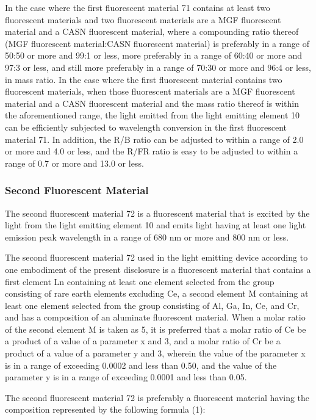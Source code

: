\documentclass[11pt,a4paper]{article}
\begin{document}
In the case where the first fluorescent material 71 contains at least two fluorescent materials and two fluorescent materials are a MGF fluorescent material and a CASN fluorescent material, where a compounding ratio thereof (MGF fluorescent material:CASN fluorescent material) is preferably in a range of 50:50 or more and 99:1 or less, more preferably in a range of 60:40 or more and 97:3 or less, and still more preferably in a range of 70:30 or more and 96:4 or less, in mass ratio. In the case where the first fluorescent material contains two fluorescent materials, when those fluorescent materials are a MGF fluorescent material and a CASN fluorescent material and the mass ratio thereof is within the aforementioned range, the light emitted from the light emitting element 10 can be efficiently subjected to wavelength conversion in the first fluorescent material 71. In addition, the R/B ratio can be adjusted to within a range of 2.0 or more and 4.0 or less, and the R/FR ratio is easy to be adjusted to within a range of 0.7 or more and 13.0 or less.

\subsubsection{Second Fluorescent Material}

The second fluorescent material 72 is a fluorescent material that is excited by the light from the light emitting element 10 and emits light having at least one light emission peak wavelength in a range of 680 nm or more and 800 nm or less.

The second fluorescent material 72 used in the light emitting device according to one embodiment of the present disclosure is a fluorescent material that contains a first element Ln containing at least one element selected from the group consisting of rare earth elements excluding Ce, a second element M containing at least one element selected from the group consisting of Al, Ga, In, Ce, and Cr, and has a composition of an aluminate fluorescent material. When a molar ratio of the second element M is taken as 5, it is preferred that a molar ratio of Ce be a product of a value of a parameter x and 3, and a molar ratio of Cr be a product of a value of a parameter y and 3, wherein the value of the parameter x is in a range of exceeding 0.0002 and less than 0.50, and the value of the parameter y is in a range of exceeding 0.0001 and less than 0.05.

The second fluorescent material 72 is preferably a fluorescent material having the composition represented by the following formula (1):
\end{document}
